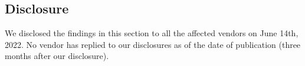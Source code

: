 


\subsection{Disclosure}
\label{sec:disclosure}

We disclosed the findings in this section to all the affected
vendors on June 14th, 2022. No vendor has replied to our disclosures as of the date of
publication (three months after our disclosure).
